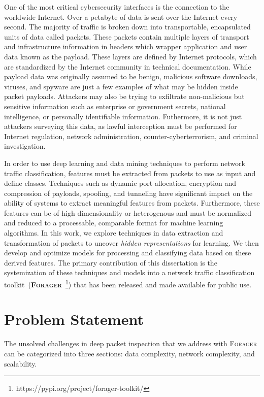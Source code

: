 One of the most critical cybersecurity interfaces is the connection to the worldwide Internet. Over a petabyte of data is sent over the Internet every second. The majority of traffic is broken down into transportable, encapsulated units of data called packets. These packets contain multiple layers of transport and infrastructure information in headers which wrapper application and user data known as the payload. These layers are defined by Internet protocols, which are standardized by the Internet community in technical documentation. While payload data was originally assumed to be benign, malicious software downloads, viruses, and spyware are just a few examples of what may be hidden inside packet payloads. Attackers may also be trying to exfiltrate non-malicious but sensitive information such as enterprise or government secrets, national intelligence, or personally identifiable information. Futhermore, it is not just attackers surveying this data, as lawful interception must be performed for Internet regulation, network administration, counter-cyberterrorism, and criminal investigation.


In order to use deep learning and data mining techniques to perform network traffic classification, features must be extracted from packets to use as input and define classes. Techniques such as dynamic port allocation, encryption and compression of payloads, spoofing, and tunneling have significant impact on the ability of systems to extract meaningful features from packets. Furthermore, these features can be of high dimensionality or heterogenous and must be normalized and reduced to a processable, comparable format for machine learning algorithms. In this work, we explore techniques in data extraction and transformation of packets to uncover \textit{hidden representations} for learning. We then develop and optimize models for processing and classifying data based on these derived features. The primary contribution of this dissertation is the systemization of these techniques and models into a network traffic classification toolkit~\textsc{(\textbf{Forager}~\footnote{https://pypi.org/project/forager-toolkit/})} that has been released and made available for public use.

\section{Problem Statement}

The unsolved challenges in deep packet inspection that we address with \textsc{Forager} can be categorized into three sections: data complexity, network complexity, and scalability.

